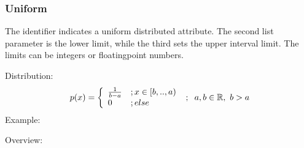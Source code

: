 \documentclass[letterpaper,10pt,english]{sphinxmanual}
\begin{document}
\subsubsection{Uniform}
\label{\detokenize{source/Interface_files/attribute_values:uniform}}\label{\detokenize{source/Interface_files/attribute_values:id5}}
\sphinxAtStartPar
The identifier  indicates a uniform distributed attribute. The second list parameter  is the lower limit, while
the third  sets the upper interval limit. The limits can be integers or floating\sphinxhyphen{}point numbers.

\sphinxAtStartPar
Distribution:
\begin{equation*}
\begin{split}p(x) = \left\{\begin{array}{ll}\frac{1}{b-a} & ;x\in\lbrack b,..,a) \\
                     0 & ;else\end{array}\right.\ ;\hspace{0.2cm} a,b\in\mathbb{R},\ b>a\end{split}
\end{equation*}
\sphinxAtStartPar
Example:

\begin{sphinxVerbatim}[commandchars=\\\{\}]
 \PYG{p}{[}\PYG{p}{]}
\end{sphinxVerbatim}


\sphinxAtStartPar
Overview:
\end{document}
